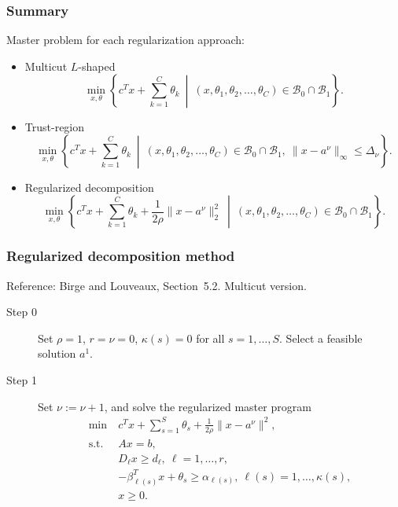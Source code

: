 \documentclass[aspectratio=169]{beamer}
\begin{document}
\begin{frame}
\frametitle{Summary}

\footnotesize
Master problem for each regularization approach:
\begin{itemize}
\item
{\red Multicut $L$-shaped}
\[
\min_{x, \theta} \left\lbrace c^Tx + \sum_{k = 1}^C \theta_k \ \middle|\ (x, \theta_1, \theta_2,\ldots, \theta_C) \in \mathcal{B}_0 \cap \mathcal{B}_1 \right\rbrace.
\]
\item
{\red Trust-region}
\[
\min_{x, \theta} \left\lbrace c^Tx + \sum_{k = 1}^C \theta_k \ \middle|\ (x, \theta_1, \theta_2,\ldots, \theta_C) \in \mathcal{B}_0 \cap \mathcal{B}_1, \ \| x-a^{\nu} \|_{\infty} \leq \Delta_{\nu} \right\rbrace.
\]
\item
{\red Regularized decomposition}
\[
\min_{x, \theta} \left\lbrace c^Tx + \sum_{k = 1}^C \theta_k + \frac{1}{2\rho} \| x-a^{\nu} \|_2^2 \ \middle|\ (x, \theta_1, \theta_2,\ldots, \theta_C) \in \mathcal{B}_0 \cap \mathcal{B}_1 \right\rbrace.
\]
\end{itemize}

\end{frame}

\begin{frame}
\frametitle{Regularized decomposition method}

{\red Reference: Birge and Louveaux, Section~5.2}. Multicut version.

\begin{description}
\item[Step 0]
Set $\rho = 1$, $r = \nu = 0$, $\kappa(s) = 0$ for all $s = 1,\ldots,S$.
Select a feasible solution $a^1$.
\item[Step 1]
Set $\nu := \nu+1$, and solve the regularized master program
\begin{align*}
\min\ & c^Tx + \sum_{s = 1}^S \theta_s + \frac{1}{2\rho} \| x - a^{\nu}
\|^2,\\
\text{s.t. } & Ax = b,\\
& D_{\ell} x \geq d_{\ell},\ \ell = 1,\ldots,r, \\
& -\beta^T_{\ell(s)} x + \theta_s \geq \alpha_{\ell(s)},\ \ell(s) =
1,\ldots,\kappa(s),\\
& x \geq 0.
\end{align*}
\end{description}

\end{frame}
\end{document}

